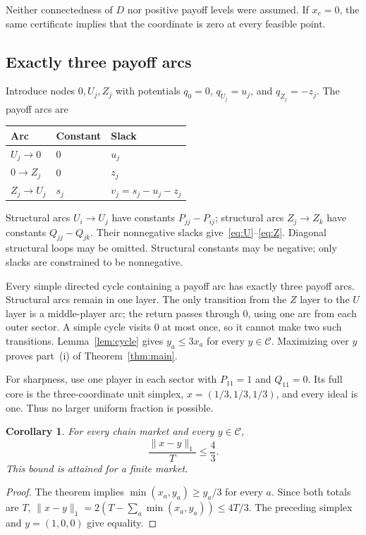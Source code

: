 \documentclass[11pt]{article}
\newtheorem{corollary}[theorem]{Corollary}
\theoremstyle{remark}\newtheorem{remark}[theorem]{Remark}
\newcommand{\core}{\mathcal C}
\begin{document}
Neither connectedness of $D$ nor positive payoff levels were assumed.
If $x_e=0$, the same certificate implies that the coordinate is zero at
every feasible point.

\subsection{Exactly three payoff arcs}
Introduce nodes $0,U_j,Z_j$ with potentials
$q_0=0$, $q_{U_j}=u_j$, and $q_{Z_j}=-z_j$.
The payoff arcs are
\begin{center}
\begin{tabular}{lll}\toprule
Arc & Constant & Slack\\\midrule
$U_j\to0$ & $0$ & $u_j$\\
$0\to Z_j$ & $0$ & $z_j$\\
$Z_j\to U_j$ & $s_j$ & $v_j=s_j-u_j-z_j$\\\bottomrule
\end{tabular}
\end{center}
Structural arcs $U_i\to U_j$ have constants $P_{jj}-P_{ij}$;
structural arcs $Z_j\to Z_k$ have constants $Q_{jj}-Q_{jk}$.
Their nonnegative slacks give~\eqref{eq:U}--\eqref{eq:Z}.
Diagonal structural loops may be omitted. Structural constants may be
negative; only slacks are constrained to be nonnegative.

Every simple directed cycle containing a payoff arc has exactly three
payoff arcs. Structural arcs remain in one layer. The only transition
from the $Z$ layer to the $U$ layer is a middle-player arc; the return
passes through $0$, using one arc from each outer sector. A simple cycle
visits $0$ at most once, so it cannot make two such transitions.
Lemma~\ref{lem:cycle} gives $y_a\leq3x_a$ for every $y\in\core$.
Maximizing over $y$ proves part~(i) of Theorem~\ref{thm:main}.

For sharpness, use one player in each sector with $P_{11}=1$ and
$Q_{11}=0$. Its full core is the three-coordinate unit simplex,
$x=(1/3,1/3,1/3)$, and every ideal is one. Thus no larger uniform
fraction is possible.

\begin{corollary}\label{cor:distance}
For every chain market and every $y\in\core$,
\[
                    \frac{\|x-y\|_1}{T}\leq\frac43.
\]
This bound is attained for a finite market.
\end{corollary}
\begin{proof}
The theorem implies $\min(x_a,y_a)\geq y_a/3$ for every $a$.
Since both totals are $T$,
$\|x-y\|_1=2(T-\sum_a\min(x_a,y_a))\leq4T/3$.
The preceding simplex and $y=(1,0,0)$ give equality.
\end{proof}
\end{document}
